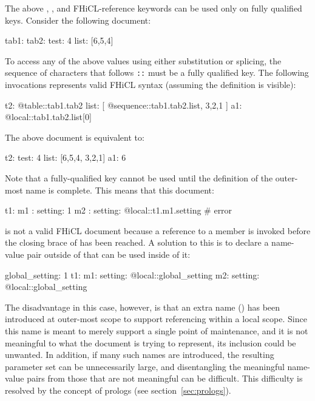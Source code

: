 \documentclass[draftmode,draftwater]{memarticle}
\makeatletter
\newcommand{\atlocal}{\fclcode{@local::}\xspace}
\newcommand{\atsequence}{\fclcode{@sequence::}\xspace}
\newcommand{\attable}{\fclcode{@table::}\xspace}
\makeatother
\begin{document}
The above \atlocal, \attable, and \atsequence FHiCL-reference keywords
can be used only on fully qualified keys.  Consider the following
document:
%
\Needspace{0.34in}
\begin{fcllisting}[texcl,escapechar=`]
tab1: {
   tab2: {
      test: 4
      list: [6,5,4]
   }
}
\end{fcllisting}
%
To access any of the above values using either substitution or
splicing, the sequence of characters that follows \verb|::| must be a
fully qualified key.  The following invocations represents valid FHiCL
syntax (assuming the  definition is visible):
%
\Needspace{0.34in}
\begin{fcllisting}[texcl,escapechar=`]
t2: {
   @table::tab1.tab2
   list: [ @sequence::tab1.tab2.list, 3,2,1 ]
}
a1: @local::tab1.tab2.list[0]
\end{fcllisting}
%
The above document is equivalent to:
%
\Needspace{0.34in}
\begin{fcllisting}[texcl,escapechar=`]
t2: {
   test: 4
   list: [6,5,4, 3,2,1]
}
a1: 6
\end{fcllisting}
%

Note that a fully-qualified key cannot be used until the definition of
the outer-most name is complete.  This means that this document:
%
\Needspace{0.34in}
\begin{fcllisting}[texcl,escapechar=`]
t1: {
   m1 : { setting: 1 }
   m2 : { setting: @local::t1.m1.setting }  # error
}
\end{fcllisting}
%
is not a valid FHiCL document because a reference to a 
member is invoked before the closing brace of  has been
reached.  A solution to this is to declare a name-value pair outside
of  that can be used inside of it:
%
\Needspace{0.34in}
\begin{fcllisting}[texcl,escapechar=`]
global_setting: 1
t1: {
   m1: { setting: @local::global_setting }
   m2: { setting: @local::global_setting }
}
\end{fcllisting}
%
The disadvantage in this case, however, is that an extra name
() has been introduced at outer-most scope to
support referencing within a local scope.  Since this name is meant to
merely support a single point of maintenance, and it is not meaningful
to what the document is trying to represent, its inclusion could be
unwanted.  In addition, if many such names are introduced, the
resulting parameter set can be unnecessarily large, and disentangling
the meaningful name-value pairs from those that are not meaningful can
be difficult.  This difficulty is resolved by the concept of prologs
(see section~\ref{sec:prologs}).
\end{document}
